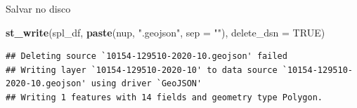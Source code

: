 \documentclass[ignorenonframetext,]{beamer}
\newenvironment{Shaded}{\begin{snugshade}}{\end{snugshade}}
\newcommand{\DataTypeTok}[1]{\textcolor[rgb]{0.13,0.29,0.53}{#1}}
\newcommand{\KeywordTok}[1]{\textcolor[rgb]{0.13,0.29,0.53}{\textbf{#1}}}
\newcommand{\NormalTok}[1]{#1}
\newcommand{\OtherTok}[1]{\textcolor[rgb]{0.56,0.35,0.01}{#1}}
\newcommand{\StringTok}[1]{\textcolor[rgb]{0.31,0.60,0.02}{#1}}
\begin{document}
\begin{frame}[fragile]{Salvar no disco}
\protect\hypertarget{salvar-no-disco}{}

\scriptsize

\begin{Shaded}
\begin{Highlighting}[]
\KeywordTok{st_write}\NormalTok{(spl_df, }\KeywordTok{paste}\NormalTok{(nup, }\StringTok{".geojson"}\NormalTok{, }\DataTypeTok{sep =} \StringTok{""}\NormalTok{), }
         \DataTypeTok{delete_dsn =} \OtherTok{TRUE}\NormalTok{)}
\end{Highlighting}
\end{Shaded}

\begin{verbatim}
## Deleting source `10154-129510-2020-10.geojson' failed
## Writing layer `10154-129510-2020-10' to data source `10154-129510-2020-10.geojson' using driver `GeoJSON'
## Writing 1 features with 14 fields and geometry type Polygon.
\end{verbatim}

\end{frame}
\end{document}
